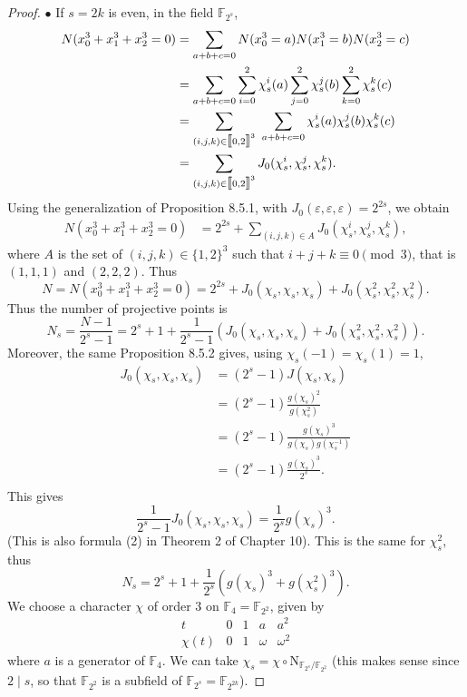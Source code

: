 \documentclass[11pt,a4paper]{article}
\def\gcro{\mbox{[\hspace{-.15em}[}}%
\def\dcro{\mbox{]\hspace{-.15em}]}}
\newcommand{\F}{\mathbb{F}}
\begin{document}
\begin{proof}
\item[$\bullet$]  If $s = 2k$ is even, in the field $\F_{2^s}$,
\begin{align*}
N(x_0^3 + x_1^3 + x_2^3 = 0) &= \sum_{a+b+c = 0} N(x_0^3 = a) N(x_1^3 = b) N(x_2^3 = c)\\
&= \sum_{a+b+c = 0} \sum_{i=0}^2 \chi_s^i (a) \sum_{j=0}^2 \chi_s^j (b) \sum_{k=0}^2 \chi_s^k(c)\\
&=\sum_{(i,j,k) \in \gcro 0, 2 \dcro^3} \ \sum_{a+b+c = 0} \chi_s^i (a) \chi_s^j (b)\chi_s^k(c)\\
&=\sum_{(i,j,k) \in \gcro 0, 2 \dcro^3} J_0(\chi_s^i, \chi_s^j, \chi_s^k).
\end{align*}
Using the generalization of Proposition 8.5.1, with $J_0(\varepsilon,\varepsilon,\varepsilon) = 2^{2s}$, we obtain
\begin{align*}
N(x_0^3 + x_1^3 + x_2^3 = 0) &= 2^{2s} + \sum_{(i,j,k) \in A} J_0(\chi_s^i, \chi_s^j, \chi_s^k),
\end{align*}
where $A$ is the set of $(i,j,k) \in  \{1,2\}^3$ such that $i+j+k  \equiv 0 \pmod 3$, that is $(1,1,1)$ and $(2,2,2)$. Thus
$$N = N(x_0^3 + x_1^3 + x_2^3 = 0) = 2^{2s} + J_0(\chi_s,\chi_s,\chi_s) + J_0(\chi_s^2,\chi_s^2,\chi_s^2).$$
Thus the number of projective points is
$$N_s = \frac{N-1}{2^s - 1} = 2^s + 1 +\frac{1}{2^s - 1}(J_0(\chi_s,\chi_s,\chi_s) + J_0(\chi_s^2,\chi_s^2,\chi_s^2)).$$
Moreover, the same Proposition 8.5.2 gives, using $\chi_s(-1) = \chi_s(1) = 1$,
\begin{align*}
J_0(\chi_s,\chi_s,\chi_s)  &= (2^s-1) J(\chi_s,\chi_s)\\
&= (2^s -1) \frac{g(\chi_s)^2}{g(\chi_s^2)}\\
&= (2^s -1) \frac{g(\chi_s)^3}{g(\chi_s) g(\chi_s^{-1})}\\
&= (2^s - 1) \frac{g(\chi_s)^3}{2^s}.\\
\end{align*}
This gives
$$\frac{1}{2^s - 1} J_0(\chi_s,\chi_s,\chi_s)  = \frac{1}{2^s} g(\chi_s)^3.$$
(This is also formula (2) in Theorem 2 of Chapter 10). This is the same for $\chi_s^2$, thus
$$N_s = 2^s +1 + \frac{1}{2^s} ( g(\chi_s)^3 + g(\chi_s^2)^3).$$
We choose a character $\chi$ of order $3$ on $\F_4 = \F_{2^2}$, given by
$$
\begin{array}{c|cccc|}
t & 0 & 1 & a & a^2\\
\hline
\chi(t) & 0 & 1 & \omega & \omega^2
\end{array}
$$
where $a$ is a generator of $\F_4$.
We can take $\chi_s = \chi \circ \mathrm{N}_{\F_{2^s}/ \F_{2^2}}$ (this makes sense since $2 \mid s$, so that $\F_{2^2}$ is a subfield of $\F_{2^s} = \F_{2^{2k}}$).


\end{proof}
\end{document}
